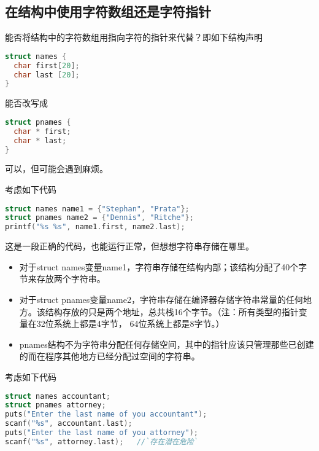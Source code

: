 \subsection{在结构中使用字符数组还是字符指针}
\begin{frame}[fragile]\ft{\subsecname}
\begin{wenti}
能否将结构中的字符数组用指向字符的指针来代替？即如下结构声明
\begin{lstlisting}[language=c,backgroundcolor=\color{red!20}]
struct names {
  char first[20];
  char last [20];
}
\end{lstlisting}
能否改写成
\begin{lstlisting}[language=c,backgroundcolor=\color{red!20}]
struct pnames {
  char * first;
  char * last;
}
\end{lstlisting}
\end{wenti} \pause 
{\Large 可以}，但可能会遇到麻烦。
\end{frame}

\begin{frame}[fragile]\ft{\subsecname}
考虑如下代码
\begin{lstlisting}[language=c,backgroundcolor=\color{red!20}]
struct names name1 = {"Stephan", "Prata"};
struct pnames name2 = {"Dennis", "Ritche"};
printf("%s %s", name1.first, name2.last);
\end{lstlisting}
这是一段正确的代码，也能运行正常，但想想字符串存储在哪里。
\end{frame}

\begin{frame}[fragile]\ft{\subsecname}
\begin{itemize}
\item 对于{\tf struct names}变量{\tf name1}，字符串存储在结构内部；该结构分配了40个字节来存放两个字符串。\\[0.1in]
\item 对于{\tf struct pnames}变量{\tf name2}，字符串存储在编译器存储字符串常量的任何地方。该结构存放的只是两个地址，总共栈16个字节。\textcolor{acolor1}{（注：所有类型的指针变量在32位系统上都是4字节， 64位系统上都是8字节。）}\\[0.1in]
\item[]
 {\tf pnames}结构不为字符串分配任何存储空间，其中的指针应该只管理那些已创建的而在程序其他地方已经分配过空间的字符串。
\end{itemize}
\end{frame}

\begin{frame}[fragile]\ft{\subsecname}
考虑如下代码
\begin{lstlisting}[language=c,backgroundcolor=\color{red!20}]
struct names accountant;
struct pnames attorney;
puts("Enter the last name of you accountant");
scanf("%s", accountant.last);
puts("Enter the last name of you attorney");
scanf("%s", attorney.last);   //`存在潜在危险`
\end{lstlisting}
\end{frame}

